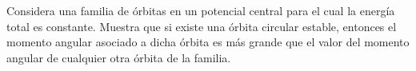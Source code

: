 \documentclass[../main.tex]{subfiles}
\begin{document}
\begin{problema}
	Considera una familia de órbitas en un potencial central
	para el cual la energía total es constante. Muestra que si
	existe una órbita circular estable, entonces el momento angular
	asociado a dicha órbita es más grande que el valor del momento
	angular de cualquier otra órbita de la familia.
\end{problema}
\end{document}
